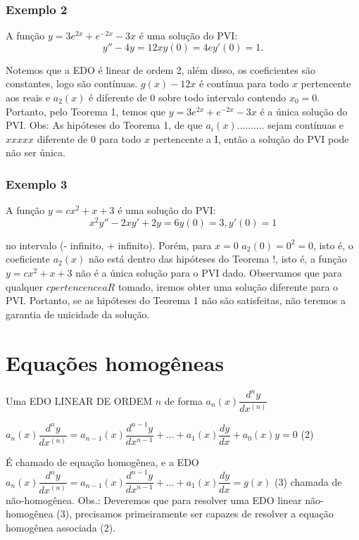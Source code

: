 \subsubsection{Exemplo 2}
A função $y=3e^{2x}+ e^{-2x} -3x$ é uma solução do PVI:
\begin{equation}\label{key}
y'' - 4y = 12x
y(0) = 4 e y'(0) = 1.
\end{equation}

Notemos que a EDO é linear de ordem 2, além disso, os coeficientes são constantes, logo são contínuas. $g(x) - 12x$ é contínua para todo $x$ pertencente aos reais e $a_{2}(x)$ é diferente de 0 sobre todo intervalo contendo $x_{0} = 0$.
Portanto, pelo Teorema 1, temos que $y=3e^{2x} + e^{-2x} -3x$ é a única solução do PVI.
Obs: As hipóteses do Teorema 1, de que $a_{i}(x)..........$ sejam contínuas e $xxxxx$ diferente de 0 para todo $x$ pertencente a I, então a solução do PVI pode não ser única.

\subsubsection{Exemplo 3}
A função $y = cx^{2} + x + 3$ é uma solução do PVI:
\begin{equation*}\label{ex3}
x^{2}y'' - 2xy' +2y = 6
y(0) = 3, y'(0) = 1
\end{equation*}

no intervalo (- infinito, + infinito). Porém, para $x = 0$ $a_{2}(0) = 0^{2} = 0$, isto é, o coeficiente $a_{2}(x)$ não está dentro das hipóteses do Teorema !, isto é, a função $y = cx^2+x+3$ não é a única solução para o PVI dado. Observamos que para qualquer $c pertencence a R$ tomado, iremos obter uma solução diferente para o PVI. Portanto, se as hipóteses do Teorema 1 não são satisfeitas, não teremos a garantia de unicidade da solução.

\section{Equações homogêneas}
Uma EDO LINEAR DE ORDEM $n$ de forma $a_n(x)\dfrac{d^ny}{dx^(n)}$

$a_n(x)\dfrac{d^ny}{dx^(n)}=a_{n-1}(x)\dfrac{d^{n-1}y}{dx^{n-1}}+...+a_1(x)\dfrac{dy}{dx}+a_0(x)y=0$ (2)

É chamado de equação homogênea, e a EDO
$a_n(x)\dfrac{d^ny}{dx^(n)}=a_{n-1}(x)\dfrac{d^{n-1}y}{dx^{n-1}}+...+a_1(x)\dfrac{dy}{dx}=g(x)$ (3)
chamada de não-homogênea.
Obs.: Deveremos que para resolver uma EDO linear não-homogênea (3), precisamos primeiramente ser capazes de resolver a equação homogênea associada (2).

